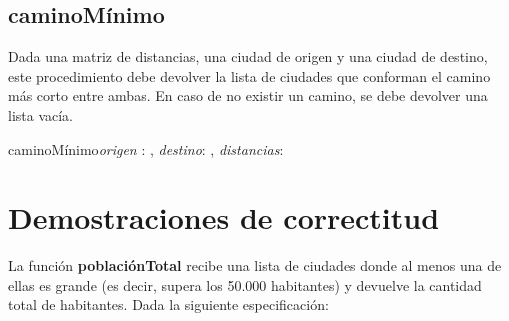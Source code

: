 \documentclass[10pt,a4paper]{article}
\begin{document}
\vspace{4mm}


\subsection{caminoMínimo}

 Dada una matriz de distancias, una ciudad de origen y una ciudad de destino, este procedimiento debe devolver la lista de ciudades que conforman el camino más corto entre ambas. En caso de no existir un camino, se debe devolver una lista vacía.

 \vspace{2mm}

 \begin{proc}{caminoMínimo}{\In \textit{origen} : \ent, \In \textit{destino}: \ent, \In \textit{distancias}: \TLista{\TLista{\ent}}}{\TLista{\ent}}
\end{proc}





\vspace{8mm}



\section{Demostraciones de correctitud}

La función \textbf{poblaciónTotal} recibe una lista de ciudades donde al menos una de ellas es grande (es decir, supera los 50.000 habitantes) y devuelve la cantidad total de habitantes. Dada la siguiente especificación:
\end{document}
